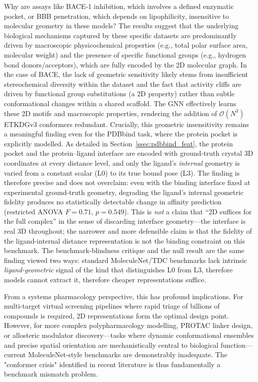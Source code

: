 \documentclass[pdflatex,sn-vancouver-num]{sn-jnl}%
\theoremstyle{thmstyleone}%
\theoremstyle{thmstyletwo}%
\theoremstyle{thmstylethree}%
\begin{document}
Why are assays like BACE-1 inhibition, which involves a defined enzymatic pocket, or BBB penetration, which depends on lipophilicity, insensitive to molecular geometry in these models? The results suggest that the underlying biological mechanisms captured by these specific datasets are predominantly driven by macroscopic physicochemical properties (e.g., total polar surface area, molecular weight) and the presence of specific functional groups (e.g., hydrogen bond donors/acceptors), which are fully encoded by the 2D molecular graph. In the case of BACE, the lack of geometric sensitivity likely stems from insufficient stereochemical diversity within the dataset and the fact that activity cliffs are driven by functional group substitutions (a 2D property) rather than subtle conformational changes within a shared scaffold. The GNN effectively learns these 2D motifs and macroscopic properties, rendering the addition of $\mathcal{O}(N^3)$ ETKDGv3 conformers redundant. Crucially, this geometric insensitivity remains a meaningful finding even for the PDBbind task, where the protein pocket is explicitly modelled. As detailed in Section~\ref{ssec:pdbbind_feat}, the protein pocket and the protein--ligand interface are encoded with ground-truth crystal 3D coordinates at every distance level, and only the ligand's \emph{internal} geometry is varied from a constant scalar (L0) to its true bound pose (L3). The finding is therefore precise and does not overclaim: even with the binding interface fixed at experimental ground-truth geometry, degrading the ligand's internal geometric fidelity produces no statistically detectable change in affinity prediction (restricted ANOVA $F = 0.71$, $p = 0.549$). This is \emph{not} a claim that ``2D suffices for the full complex'' in the sense of discarding interface geometry---the interface is real 3D throughout; the narrower and more defensible claim is that the fidelity of the ligand-internal distance representation is not the binding constraint on this benchmark. The benchmark-blindness critique and the null result are the same finding viewed two ways: standard MoleculeNet/TDC benchmarks lack intrinsic \emph{ligand-geometric} signal of the kind that distinguishes L0 from L3, therefore models cannot extract it, therefore cheaper representations suffice. 

From a systems pharmacology perspective, this has profound implications. For multi-target virtual screening pipelines where rapid triage of billions of compounds is required, 2D representations form the optimal design point. However, for more complex polypharmacology modelling, PROTAC linker design, or allosteric modulator discovery---tasks where dynamic conformational ensembles and precise spatial orientation are mechanistically central to biological function---current MoleculeNet-style benchmarks are demonstrably inadequate. The "conformer crisis" identified in recent literature \cite{hamakawa2025conformation, Castaneda_Leautaud_2025} is thus fundamentally a benchmark mismatch problem. 
\end{document}

